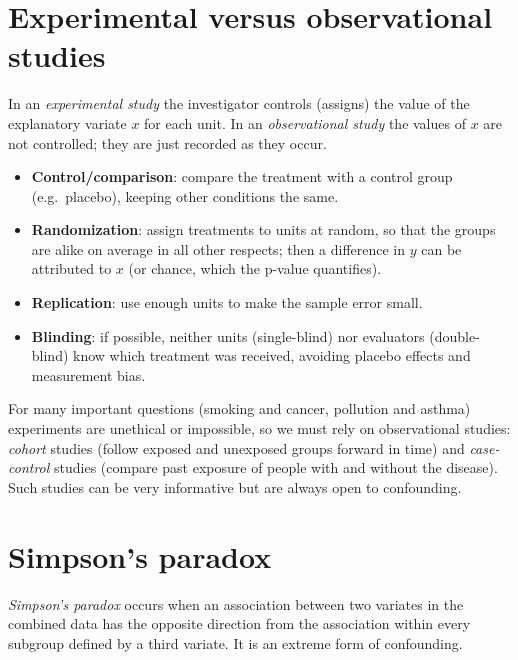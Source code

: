 \section{Experimental versus observational studies}

\begin{definition}
In an \emph{experimental study} the investigator controls (assigns) the value of the
explanatory variate $x$ for each unit. In an \emph{observational study} the values of $x$
are not controlled; they are just recorded as they occur.
\end{definition}

\begin{important}
\begin{itemize}
  \item \textbf{Control/comparison}: compare the treatment with a control group (e.g.\
        placebo), keeping other conditions the same.
  \item \textbf{Randomization}: assign treatments to units at random, so that the groups
        are alike on average in all other respects; then a difference in $y$ can be
        attributed to $x$ (or chance, which the p-value quantifies).
  \item \textbf{Replication}: use enough units to make the sample error small.
  \item \textbf{Blinding}: if possible, neither units (single-blind) nor evaluators
        (double-blind) know which treatment was received, avoiding placebo effects and
        measurement bias.
\end{itemize}
\end{important}

For many important questions (smoking and cancer, pollution and asthma) experiments are
unethical or impossible, so we must rely on observational studies: \emph{cohort} studies
(follow exposed and unexposed groups forward in time) and \emph{case-control} studies
(compare past exposure of people with and without the disease). Such studies can be very
informative but are always open to confounding.

\section{Simpson's paradox}

\begin{definition}
\emph{Simpson's paradox} occurs when an association between two variates in the
combined data has the opposite direction from the association within every subgroup
defined by a third variate. It is an extreme form of confounding.
\end{definition}

